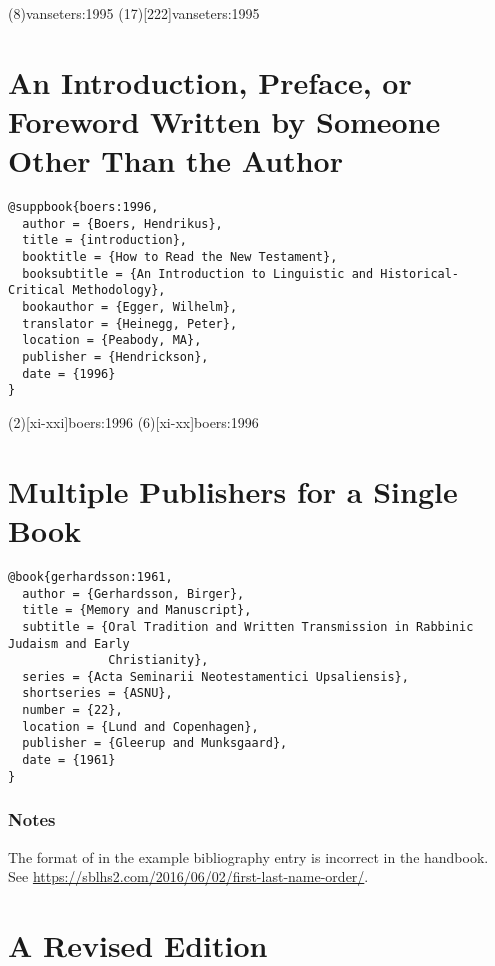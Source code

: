 \documentclass[a4paper]{article}
\begin{document}
\examplecite(8){vanseters:1995}
\examplecite(17)[222]{vanseters:1995}
\examplebibliography

\section{An Introduction, Preface, or Foreword Written by Someone Other Than the Author}

\begin{verbatim}
@suppbook{boers:1996,
  author = {Boers, Hendrikus},
  title = {introduction},
  booktitle = {How to Read the New Testament},
  booksubtitle = {An Introduction to Linguistic and Historical-Critical Methodology},
  bookauthor = {Egger, Wilhelm},
  translator = {Heinegg, Peter},
  location = {Peabody, MA},
  publisher = {Hendrickson},
  date = {1996}
}
\end{verbatim}

\examplecite(2)[xi-xxi]{boers:1996}
\examplecite(6)[xi-xx]{boers:1996}
\examplebibliography

\section{Multiple Publishers for a Single Book}

\begin{verbatim}
@book{gerhardsson:1961,
  author = {Gerhardsson, Birger},
  title = {Memory and Manuscript},
  subtitle = {Oral Tradition and Written Transmission in Rabbinic Judaism and Early
              Christianity},
  series = {Acta Seminarii Neotestamentici Upsaliensis},
  shortseries = {ASNU},
  number = {22},
  location = {Lund and Copenhagen},
  publisher = {Gleerup and Munksgaard},
  date = {1961}
}
\end{verbatim}

\begin{verbcite}
  \nocite{gerhardsson:1961}
\end{verbcite}
\exampleabbreviations
\examplebibliography

\subsubsection{Notes}

The format of  in the example bibliography
entry is incorrect in the handbook. See
\url{https://sblhs2.com/2016/06/02/first-last-name-order/}.

\section{A Revised Edition}
\end{document}
